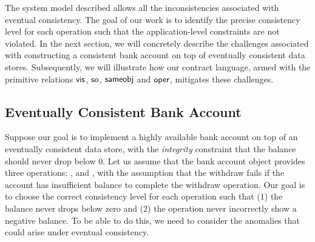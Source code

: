 The system model described allows all the inconsistencies associated with
eventual consistency. The goal of our work is to identify the precise
consistency level for each operation such that the application-level
constraints are not violated. In the next section, we will concretely describe
the challenges associated with constructing a consistent bank account on top of
eventually consistent data stores. Subsequently, we will illustrate how our
contract language, armed with the primitive relations ${\normalfont \textsf{vis}}$, ${\normalfont \textsf{so}}$,
${\normalfont \textsf{sameobj}}$ and ${\normalfont \textsf{oper}}$, mitigates these challenges.

\subsection{Eventually Consistent Bank Account}

Suppose our goal is to implement a highly available bank account on top of an
eventually consistent data store, with the \emph{integrity} constraint that the
balance should never drop below 0. Let us assume that the bank account object
provides three operations: ,  and ,
with the assumption that the withdraw fails if the account has insufficient
balance to complete the withdraw operation. Our goal is to choose the correct
consistency level for each operation such that (1) the balance never drops
below zero and (2) the  operation never incorrectly show a
negative balance. To be able to do this, we need to consider the anomalies that
could arise under eventual consistency.

